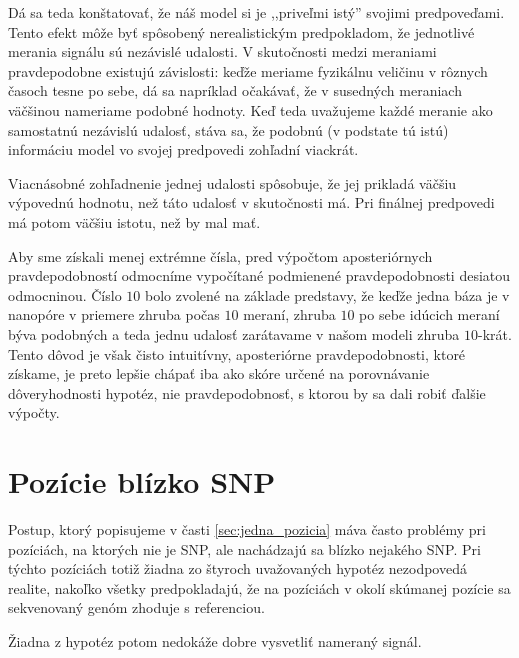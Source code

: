 
Dá sa teda konštatovať, že náš model si je ,,priveľmi istý'' svojimi predpoveďami. Tento efekt môže
byť spôsobený nerealistickým predpokladom, že jednotlivé merania 
signálu sú nezávislé udalosti. V skutočnosti medzi meraniami pravdepodobne existujú závislosti: keďže
meriame fyzikálnu veličinu v rôznych časoch tesne po sebe, dá sa napríklad očakávať, že v susedných
meraniach väčšinou nameriame podobné hodnoty. Keď teda uvažujeme každé meranie ako samostatnú nezávislú 
udalosť, stáva sa, že podobnú (v podstate tú istú) informáciu model vo svojej predpovedi zohľadní
viackrát.

Viacnásobné zohľadnenie jednej udalosti spôsobuje, že jej prikladá väčšiu výpovednú hodnotu, než táto
udalosť v skutočnosti má. Pri finálnej predpovedi má potom väčšiu istotu, než by mal mať.

Aby sme získali menej extrémne čísla, pred výpočtom aposteriórnych pravdepodobností odmocníme vypočítané 
podmienené pravdepodobnosti desiatou odmocninou. Číslo $10$ bolo zvolené na základe predstavy, že
keďže jedna báza je v nanopóre v priemere zhruba počas $10$ meraní, zhruba $10$ po sebe idúcich meraní 
býva podobných a teda jednu udalosť zarátavame v našom modeli zhruba $10$-krát. Tento dôvod je však
čisto intuitívny, aposteriórne pravdepodobnosti, ktoré získame, je preto lepšie chápať iba ako skóre 
určené na porovnávanie dôveryhodnosti hypotéz, nie pravdepodobnosť, s ktorou by sa dali robiť ďalšie 
výpočty.


\section{Pozície blízko SNP}

Postup, ktorý popisujeme v časti \ref{sec:jedna_pozicia} máva často problémy pri pozíciách, na ktorých nie je SNP, ale nachádzajú
sa blízko nejakého SNP. Pri týchto pozíciách totiž žiadna zo štyroch uvažovaných hypotéz nezodpovedá realite, nakoľko všetky predpokladajú,
že na pozíciách v okolí skúmanej pozície sa sekvenovaný genóm zhoduje s referenciou.


Žiadna z hypotéz potom nedokáže dobre vysvetliť nameraný signál.


